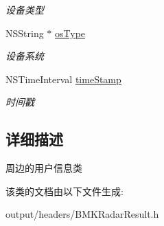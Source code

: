 \begin{DoxyCompactItemize}
\begin{DoxyCompactList}\small\item\em 设备类型 \end{DoxyCompactList}\item 
\hypertarget{interface_b_m_k_radar_nearby_info_a4ba3cf9a7739ac5a56dc3bd40b2e39e7}{}N\+S\+String $\ast$ \hyperlink{interface_b_m_k_radar_nearby_info_a4ba3cf9a7739ac5a56dc3bd40b2e39e7}{os\+Type}\label{interface_b_m_k_radar_nearby_info_a4ba3cf9a7739ac5a56dc3bd40b2e39e7}

\begin{DoxyCompactList}\small\item\em 设备系统 \end{DoxyCompactList}\item 
\hypertarget{interface_b_m_k_radar_nearby_info_a49ded5de165dd8a31bc5426d4aa4a230}{}N\+S\+Time\+Interval \hyperlink{interface_b_m_k_radar_nearby_info_a49ded5de165dd8a31bc5426d4aa4a230}{time\+Stamp}\label{interface_b_m_k_radar_nearby_info_a49ded5de165dd8a31bc5426d4aa4a230}

\begin{DoxyCompactList}\small\item\em 时间戳 \end{DoxyCompactList}\end{DoxyCompactItemize}


\subsection{详细描述}
周边的用户信息类 

该类的文档由以下文件生成\+:\begin{DoxyCompactItemize}
\item 
output/headers/B\+M\+K\+Radar\+Result.\+h\end{DoxyCompactItemize}
